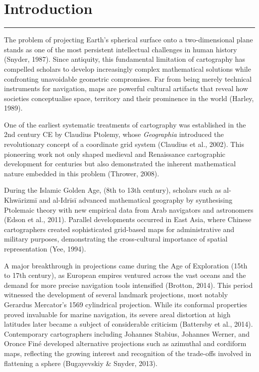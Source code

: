 \section{Introduction}
\hrule height 1pt
\vspace*{5pt}
The problem of projecting Earth's spherical surface onto a two-dimensional 
plane stands as one of the most persistent intellectual challenges in human 
history (Snyder, 1987). Since antiquity, this fundamental limitation of 
cartography has compelled scholars to develop increasingly complex 
mathematical solutions while confronting unavoidable geometric compromises. 
Far from being merely technical instruments for navigation, maps are powerful 
cultural artifacts that reveal how societies conceptualise space, territory 
and their prominence in the world (Harley, 1989). 

One of the earliest systematic treatments of cartography was established in 
the 2nd century CE by Claudius Ptolemy, whose \textit{Geographia} introduced the 
revolutionary concept of a coordinate grid system (Claudius et al., 2002).  
This pioneering work not only shaped medieval and Renaissance cartographic 
development for centuries but also demonstrated the inherent mathematical 
nature embedded in this problem (Thrower, 2008). 

During the Islamic Golden Age, (8th to 13th century), scholars such as 
al-Khwārizmī and al-Idrīsī advanced mathematical geography by synthesising 
Ptolemaic theory with new empirical data from Arab navigators and astronomers 
(Edson et al., 2011). Parallel developments occurred in East Asia, where 
Chinese cartographers created sophisticated grid-based maps for administrative 
and military purposes, demonstrating the cross-cultural importance of spatial 
representation (Yee, 1994). 

A major breakthrough in projections came during the Age of Exploration (15th 
to 17th century), as European empires ventured across the vast oceans and the 
demand for more precise navigation tools intensified (Brotton, 2014). This 
period witnessed the development of several landmark projections, most notably 
Gerardus Mercator's 1569 cylindrical projection. While its conformal 
properties proved invaluable for marine navigation, its severe areal 
distortion at high latitudes later became a subject of considerable criticism 
(Battersby et al., 2014). Contemporary cartographers including Johannes 
Stabius, Johannes Werner, and Oronce Finé developed alternative projections 
such as azimuthal and cordiform maps, reflecting the growing interest and 
recognition of the trade-offs involved in flattening a sphere (Bugayevskiy \& Snyder, 2013). 

